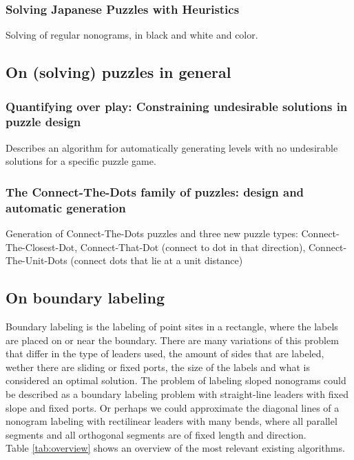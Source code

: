 \documentclass[a4paper]{article}
\begin{document}
\subsubsection{Solving Japanese Puzzles with Heuristics \cite{salcedo2007solving}}
Solving of regular nonograms, in black and white and color.\\

\subsection{On (solving) puzzles in general}

\subsubsection{Quantifying over play: Constraining undesirable solutions in puzzle design \cite{smith2013quantifying}}
Describes an algorithm for automatically generating levels with no undesirable solutions for a specific puzzle game.

\subsubsection{The Connect-The-Dots family of puzzles: design and automatic generation \cite{loffler2014connect}}
Generation of Connect-The-Dots puzzles and three new puzzle types: Connect-The-Closest-Dot, Connect-That-Dot (connect to dot in that direction), Connect-The-Unit-Dots (connect dots that lie at a unit distance)

\subsection{On boundary labeling}
Boundary labeling is the labeling of point sites in a rectangle, where the labels are placed on or near the boundary. There are many variations of this problem that differ in the type of leaders used, the amount of sides that are labeled, wether there are sliding or fixed ports, the size of the labels and what is considered an optimal solution. The problem of labeling sloped nonograms could be described as a boundary labeling problem with straight-line leaders with fixed slope and fixed ports. Or perhaps we could approximate the diagonal lines of a nonogram labeling with rectilinear leaders with many bends, where all parallel segments and all orthogonal segments are of fixed length and direction.\\
Table \ref{tab:overview} shows an overview of the most relevant existing algorithms. \\
\end{document}
